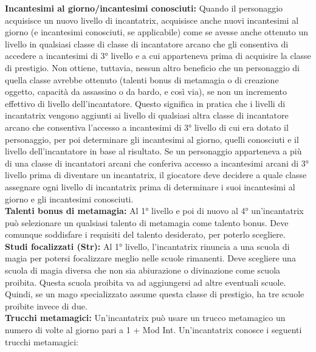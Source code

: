 \documentclass[a4paper]{report}
\begin{document}
\begin{multicols}{2}
\textbf{Incantesimi al giorno/incantesimi conosciuti:} Quando il personaggio acquisisce un nuovo livello di incantatrix, acquisisce anche nuovi incantesimi al giorno (e incantesimi conosciuti, se applicabile) come se avesse anche ottenuto un livello in qualsiasi classe di classe di incantatore arcano che gli consentiva di accedere a incantesimi di 3° livello e a cui apparteneva prima di acquisire la classe di prestigio. Non ottiene, tuttavia, nessun altro beneficio che un personaggio di quella classe avrebbe ottenuto (talenti bonus di metamagia o di creazione oggetto, capacità da assassino o da bardo, e così via), se non un incremento effettivo di livello dell'incantatore. Questo significa in pratica che i livelli di incantatrix vengono aggiunti ai livello di qualsiasi altra classe di incantatore arcano che consentiva l'accesso a incantesimi di 3° livello di cui era dotato il personaggio, per poi determinare gli incantesimi al giorno, quelli conosciuti e il livello dell'incantatore in base al risultato.
Se un personaggio apparteneva a più di una classe di incantatori arcani che conferiva accesso a incantesimi arcani di 3° livello prima di diventare un incantatrix, il giocatore deve decidere a quale classe assegnare ogni livello di incantatrix prima di determinare i suoi incantesimi al giorno e gli incantesimi conosciuti.\\

\textbf{Talenti bonus di metamagia:} Al 1° livello e poi di nuovo al 4° un'incantatrix può selezionare un qualsiasi talento di metamagia come talento bonus. Deve comunque soddisfare i requisiti del talento desiderato, per poterlo scegliere.\\

\textbf{Studi focalizzati (Str):} Al 1° livello, l'incantatrix rinuncia a una scuola di magia per potersi focalizzare meglio nelle scuole rimanenti. Deve scegliere una scuola di magia diversa che non sia abiurazione o divinazione come scuola proibita. Questa scuola proibita va ad aggiungersi ad altre eventuali scuole. Quindi, se un mago specializzato assume questa classe di prestigio, ha tre scuole proibite invece di due.\\

\textbf{Trucchi metamagici:} Un'incantatrix può usare un trucco metamagico un numero di volte al giorno pari a 1 + Mod Int. Un'incantatrix conosce i seguenti trucchi metamagici:


\end{multicols}
\end{document}
